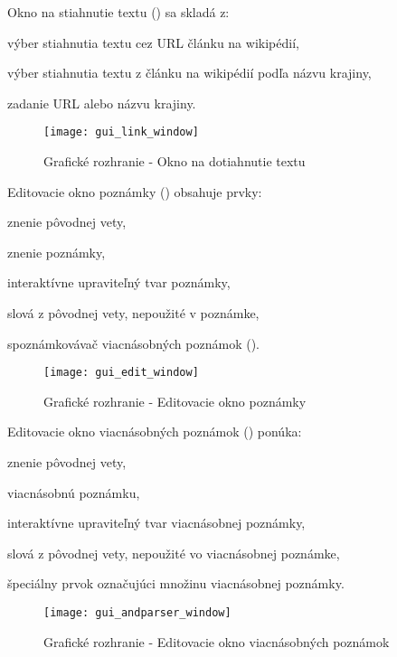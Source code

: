Okno na stiahnutie textu () sa skladá z:
\begin{my_enumerate}
	\item výber stiahnutia textu cez URL článku na wikipédií,
	\item výber stiahnutia textu z článku na wikipédií podľa názvu krajiny,
	\item zadanie URL alebo názvu krajiny.
\end{my_enumerate}
\begin{figure}[H]
	\begin{center}\texttt{[image: gui\_link\_window]}\end{center}
	\caption[Grafické rozhranie - Okno na dotiahnutie textu]{Grafické rozhranie - Okno na dotiahnutie textu}\label{appendix:gui:link_window}
\end{figure}

Editovacie okno poznámky () obsahuje prvky:
\begin{my_enumerate}
	\item znenie pôvodnej vety,
	\item znenie poznámky,
	\item interaktívne upraviteľný tvar poznámky,
	\item slová z pôvodnej vety, nepoužité v poznámke,
	\item spoznámkovávač viacnásobných poznámok ().
\end{my_enumerate}
\begin{figure}[H]
	\begin{center}\texttt{[image: gui\_edit\_window]}\end{center}
	\caption[Grafické rozhranie - Editovacie okno poznámky]{Grafické rozhranie - Editovacie okno poznámky}\label{appendix:gui:edit_window}
\end{figure}

Editovacie okno viacnásobných poznámok () ponúka:
\begin{my_enumerate}
	\item znenie pôvodnej vety,
	\item viacnásobnú poznámku,
	\item interaktívne upraviteľný tvar viacnásobnej poznámky,
	\item slová z pôvodnej vety, nepoužité vo viacnásobnej poznámke,
	\item špeciálny prvok označujúci množinu viacnásobnej poznámky.
\end{my_enumerate}
\begin{figure}[H]
	\begin{center}\texttt{[image: gui\_andparser\_window]}\end{center}
	\caption[Grafické rozhranie - Editovacie okno viacnásobných poznámok]{Grafické rozhranie - Editovacie okno viacnásobných poznámok}\label{appendix:gui:andparser_window}
\end{figure}

